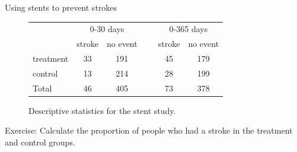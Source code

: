 \documentclass[notes,11pt, aspectratio=169]{beamer}
\begin{document}
\begin{frame}{Using stents to prevent strokes}
\begin{figure}[h]
\centering
\begin{tabular}{l cc c cc}
& \multicolumn{2}{c}{0-30 days} &\hspace{5mm}\ & \multicolumn{2}{c}{0-365 days} \\
  \cline{2-3} \cline{5-6}
	& 	stroke 	& no event && 	stroke 	& no event \\
  \hline
treatment 	& 33		& 191	&&	45 	& 179 \\
control 		& 13		& 214	&& 	28	& 199 \\
  \hline
Total				& 46		& 405	&&	73	& 378 \\
  \hline
\end{tabular}
\caption{Descriptive statistics for the stent study.}
\label{stentStudyResults}
\end{figure}

\pause

Exercise: Calculate the proportion of people who had a stroke in the
treatment and control groups.
\end{frame}
\end{document}
